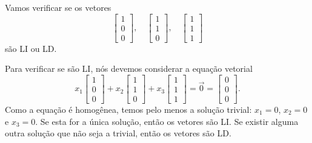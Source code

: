 \begin{ex}\label{exp:1}
Vamos verificar se os vetores
\begin{equation}
\left[
  \begin{array}{c}
    1 \\
    0 \\
    0
  \end{array}
\right], \quad
\left[
  \begin{array}{c}
    1 \\
    1 \\
    0
  \end{array}
\right], \quad
\left[
  \begin{array}{c}
    1 \\
    1 \\
    1
  \end{array}
\right]
\end{equation} são LI ou LD.

Para verificar se são LI, nós devemos considerar a equação vetorial
\begin{equation}
x_1 \left[
  \begin{array}{c}
    1 \\
    0 \\
    0
  \end{array}
\right] +
x_2\left[
  \begin{array}{c}
    1 \\
    1 \\
    0
  \end{array}
\right] +
x_3\left[
  \begin{array}{c}
    1 \\
    1 \\
    1
  \end{array}
\right] = \vec{0} =
\left[
  \begin{array}{c}
    0 \\
    0 \\
    0
  \end{array}
\right].
\end{equation} Como a equação é homogênea, temos pelo menos a solução trivial: $x_1 = 0$, $x_2=0$ e $x_3 = 0$. Se esta for a única solução, então os vetores são LI. Se existir alguma outra solução que não seja a trivial, então os vetores são LD.


\end{ex}
